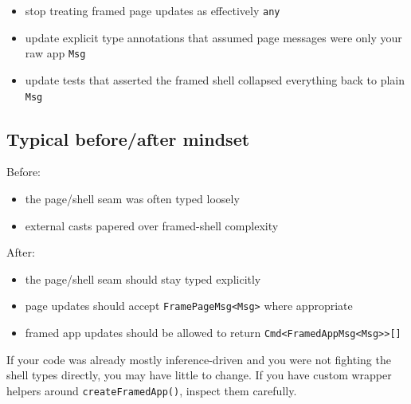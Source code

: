 \begin{itemize}
\tightlist
\item
  stop treating framed page updates as effectively \texttt{a\allowbreak{}n\allowbreak{}y}
\item
  update explicit type annotations that assumed page messages were only your raw app \texttt{M\allowbreak{}s\allowbreak{}g}
\item
  update tests that asserted the framed shell collapsed everything back to plain \texttt{M\allowbreak{}s\allowbreak{}g}
\end{itemize}

\subsection{Typical before/after mindset}\label{record-264-typical-beforeafter-mindset}

Before:

\begin{itemize}
\tightlist
\item
  the page/shell seam was often typed loosely
\item
  external casts papered over framed-shell complexity
\end{itemize}

After:

\begin{itemize}
\tightlist
\item
  the page/shell seam should stay typed explicitly
\item
  page updates should accept \texttt{F\allowbreak{}r\allowbreak{}a\allowbreak{}m\allowbreak{}e\allowbreak{}P\allowbreak{}a\allowbreak{}g\allowbreak{}e\allowbreak{}M\allowbreak{}s\allowbreak{}g\allowbreak{}<\allowbreak{}M\allowbreak{}s\allowbreak{}g\allowbreak{}>} where appropriate
\item
  framed app updates should be allowed to return \texttt{C\allowbreak{}m\allowbreak{}d\allowbreak{}<\allowbreak{}F\allowbreak{}r\allowbreak{}a\allowbreak{}m\allowbreak{}e\allowbreak{}d\allowbreak{}A\allowbreak{}p\allowbreak{}p\allowbreak{}M\allowbreak{}s\allowbreak{}g\allowbreak{}<\allowbreak{}M\allowbreak{}s\allowbreak{}g\allowbreak{}>\allowbreak{}>\allowbreak{}[\allowbreak{}]}
\end{itemize}

If your code was already mostly inference-driven and you were not fighting the shell types directly, you may have little to change. If you have custom wrapper helpers around \texttt{c\allowbreak{}r\allowbreak{}e\allowbreak{}a\allowbreak{}t\allowbreak{}e\allowbreak{}F\allowbreak{}r\allowbreak{}a\allowbreak{}m\allowbreak{}e\allowbreak{}d\allowbreak{}A\allowbreak{}p\allowbreak{}p\allowbreak{}(\allowbreak{})}, inspect them carefully.

